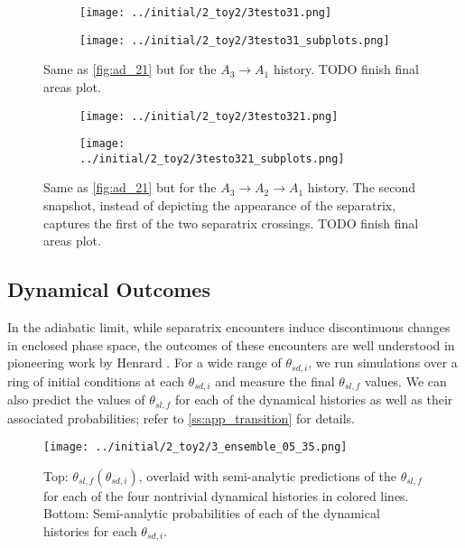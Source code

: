 \documentclass[
        fleqn,
        usenatbib,
    ]{mnras}
\newcommand*{\p}[1]{\left(#1\right)}
\begin{document}
\begin{figure}
    \centering
    \begin{subfigure}{\columnwidth}
        \centering
        \texttt{[image: ../initial/2\_toy2/3testo31.png]}
    \end{subfigure}
    \begin{subfigure}{\columnwidth}
        \centering
        \texttt{[image: ../initial/2\_toy2/3testo31\_subplots.png]}
    \end{subfigure}
    \caption{Same as \autoref{fig:ad_21} but for the $A_3 \to A_1$ history. TODO
    finish final areas plot.}\label{fig:ad_31}
\end{figure}
\begin{figure}
    \centering
    \begin{subfigure}{\columnwidth}
        \centering
        \texttt{[image: ../initial/2\_toy2/3testo321.png]}
    \end{subfigure}
    \begin{subfigure}{\columnwidth}
        \centering
        \texttt{[image: ../initial/2\_toy2/3testo321\_subplots.png]}
    \end{subfigure}
    \caption{Same as \autoref{fig:ad_21} but for the $A_3 \to A_2 \to A_1$
    history. The second snapshot, instead of depicting the appearance of the
    separatrix, captures the first of the two separatrix crossings. TODO finish
    final areas plot.}\label{fig:ad_321}
\end{figure}

\subsection{Dynamical Outcomes}\label{ss:ad_ensemble}

In the adiabatic limit, while separatrix encounters induce discontinuous changes
in enclosed phase space, the outcomes of these encounters are well understood in
pioneering work by Henrard \citep{henrard1982,henrard1987}. For a wide range of
$\theta_{sd, i}$, we run simulations over a ring of initial conditions at each
$\theta_{sd, i}$ and measure the final $\theta_{sl, f}$ values. We can also
predict the values of $\theta_{sl, f}$ for each of the dynamical histories as
well as their associated probabilities; refer to \autoref{ss:app_transition} for
details.
\begin{figure}
    \centering
    \texttt{[image: ../initial/2\_toy2/3\_ensemble\_05\_35.png]}
    \caption{Top: $\theta_{sl,f}\p{\theta_{sd, i}}$, overlaid with semi-analytic
    predictions of the $\theta_{sl, f}$ for each of the four nontrivial
    dynamical histories in colored lines. Bottom: Semi-analytic probabilities of
    each of the dynamical histories for each $\theta_{sd,
    i}$.}\label{fig:ad_ensemble}
\end{figure}
\end{document}
